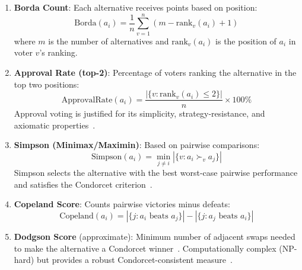\documentclass[conference]{IEEEtran}
\begin{document}
\begin{enumerate}
	\item \textbf{Borda Count}: Each alternative receives points based on position:
	\begin{equation}
		\text{Borda}(a_i) = \frac{1}{n}\sum_{v=1}^{n} (m - \text{rank}_v(a_i) + 1)
	\end{equation}
	where $m$ is the number of alternatives and $\text{rank}_v(a_i)$ is the position of $a_i$ in voter $v$'s ranking.
	
	\item \textbf{Approval Rate (top-2)}: Percentage of voters ranking the alternative in the top two positions:
	\begin{equation}
		\text{ApprovalRate}(a_i) = \frac{|\{v : \text{rank}_v(a_i) \leq 2\}|}{n} \times 100\%
	\end{equation}
	Approval voting is justified for its simplicity, strategy-resistance, and axiomatic properties~\cite{brams2007approval}.
	
	\item \textbf{Simpson (Minimax/Maximin)}: Based on pairwise comparisons:
	\begin{equation}
		\text{Simpson}(a_i) = \min_{j \neq i} |\{v : a_i \succ_v a_j\}|
	\end{equation}
	Simpson selects the alternative with the best worst-case pairwise performance and satisfies the Condorcet criterion~\cite{simpson1969defining}.
	
	\item \textbf{Copeland Score}: Counts pairwise victories minus defeats:
	\begin{equation}
		\text{Copeland}(a_i) = |\{j : a_i \text{ beats } a_j\}| - |\{j : a_j \text{ beats } a_i\}|
	\end{equation}
	
	\item \textbf{Dodgson Score} (approximate): Minimum number of adjacent swaps needed to make the alternative a Condorcet winner~\cite{dodgson1876method,caragiannis2016dodgson}. Computationally complex (NP-hard) but provides a robust Condorcet-consistent measure~\cite{bartholdi1989voting}.
\end{enumerate}

\newcommand{\smalltable}{\fontsize{7pt}{11pt}\selectfont}
\end{document}
